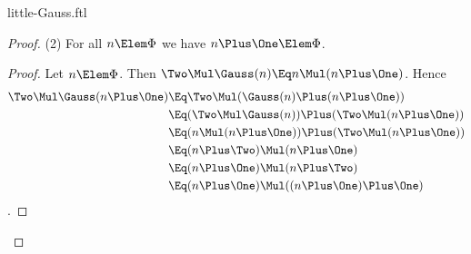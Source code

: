 \documentclass{stex}
\begin{document}
\begin{smodule}{little-Gauss.ftl}
\begin{forthel}
\begin{proof}
    (2) For all $n \Elem \Phi$ we have $n \Plus \One \Elem \Phi$.
    \begin{proof}
      Let $n \Elem \Phi$.
      Then $\Two \Mul \Gauss(n) \Eq n \Mul (n \Plus \One)$.
      Hence
      \begin{align*}
              \Two \Mul \Gauss(n \Plus \One)
        & \Eq \Two \Mul (\Gauss(n) \Plus (n \Plus \One)) \\
        & \Eq (\Two \Mul \Gauss(n)) \Plus (\Two \Mul (n \Plus \One)) \\
        & \Eq (n \Mul (n \Plus \One)) \Plus (\Two \Mul (n \Plus \One)) \\
        & \Eq (n \Plus \Two) \Mul (n \Plus \One) \\
        & \Eq (n \Plus \One) \Mul (n \Plus \Two) \\
        & \Eq (n \Plus \One) \Mul ((n \Plus \One) \Plus \One)
      \end{align*}.
    \end{proof}
  \end{proof}
\end{forthel}

\printbibliography
{}

\end{smodule}
\end{document}
